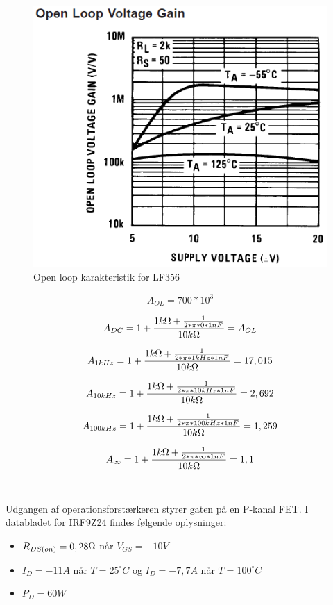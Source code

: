 \begin{figure}[H]
	\centering
	\includegraphics[scale=0.5]{../Hardware/PSU/OpenLoop}
	\caption{Open loop karakteristik for LF356}
	\label{photo:OpenLoop}
\end{figure}

\begin{equation}
	A_{OL} = 700 * 10^3
\end{equation}

\begin{equation}
	A_{DC} = 1 + \frac{1k\ohm + \frac{1}{2*\pi*0*1nF}}{10k\ohm} = A_{OL}
\end{equation}

\begin{equation}
	A_{1kHz} = 1 + \frac{1k\ohm + \frac{1}{2*\pi*1kHz*1nF}}{10k\ohm} = 17,015
\end{equation}

\begin{equation}
	A_{10kHz} = 1 + \frac{1k\ohm + \frac{1}{2*\pi*10kHz*1nF}}{10k\ohm} = 2,692
\end{equation}

\begin{equation}
	A_{100kHz} = 1 + \frac{1k\ohm + \frac{1}{2*\pi*100kHz*1nF}}{10k\ohm} = 1,259
\end{equation}

\begin{equation}
	A_{\infty} = 1 + \frac{1k\ohm + \frac{1}{2*\pi*\infty*1nF}}{10k\ohm} = 1,1
\end{equation}
\\\\
Udgangen af operationsforstærkeren styrer gaten på en P-kanal FET. I databladet for IRF9Z24 findes følgende oplysninger:
\begin{itemize}
\item $R_{DS(on)} = 0,28\ohm$ når $V_{GS} = -10V$
\item $I_D = -11A$ når $T = 25^{\circ}C$ og  $I_D = -7,7A$ når $T = 100^{\circ}C$
\item $P_D = 60W$
\end{itemize}

